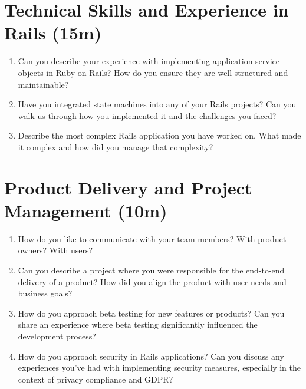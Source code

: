 \documentclass{article}
\begin{document}
\section{Technical Skills and Experience in Rails (15m)}
\begin{enumerate}
    \item Can you describe your experience with implementing application service objects in Ruby on Rails? How do you ensure they are well-structured and maintainable?
    \vspace{1.5in}
    \item Have you integrated state machines into any of your Rails projects? Can you walk us through how you implemented it and the challenges you faced?
    \vspace{1.5in}
    \item Describe the most complex Rails application you have worked on. What made it complex and how did you manage that complexity?
    \vspace{1.5in}
\end{enumerate}

\section{Product Delivery and Project Management (10m)}
\begin{enumerate}[resume]
	\item How do you like to communicate with your team members? With product owners? With users?
	 \vspace{1.5in}
    \item Can you describe a project where you were responsible for the end-to-end delivery of a product? How did you align the product with user needs and business goals?
    \vspace{1.5in}
    \item How do you approach beta testing for new features or products? Can you share an experience where beta testing significantly influenced the development process?
    \vspace{1.5in}
    \item How do you approach security in Rails applications? Can you discuss any experiences you've had with implementing security measures, especially in the context of privacy compliance and GDPR?
    \vspace{1.5in}
\end{enumerate}
\end{document}
